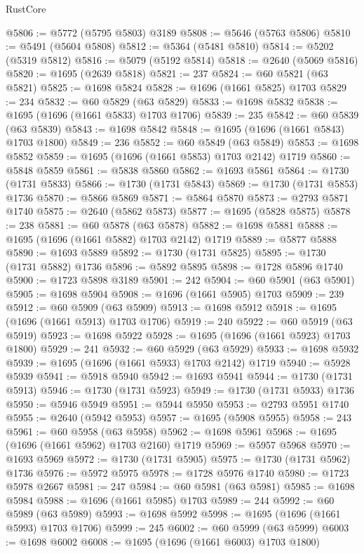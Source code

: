 \begin{lexlean}{RustCore}
\begin{coremodule}
@5806 := @5772 (@5795 @5803) @3189
@5808 := @5646 (@5763 @5806)
@5810 := @5491 (@5604 @5808)
@5812 := @5364 (@5481 @5810)
@5814 := @5202 (@5319 @5812)
@5816 := @5079 (@5192 @5814)
@5818 := @2640 (@5069 @5816)
@5820 := @1695 (@2639 @5818)
@5821 := 237
@5824 := @60 @5821 (@63 @5821)
@5825 := @1698 @5824
@5828 := @1696 (@1661 @5825) @1703
@5829 := 234
@5832 := @60 @5829 (@63 @5829)
@5833 := @1698 @5832
@5838 := @1695 (@1696 (@1661 @5833) @1703 @1706)
@5839 := 235
@5842 := @60 @5839 (@63 @5839)
@5843 := @1698 @5842
@5848 := @1695 (@1696 (@1661 @5843) @1703 @1800)
@5849 := 236
@5852 := @60 @5849 (@63 @5849)
@5853 := @1698 @5852
@5859 := @1695 (@1696 (@1661 @5853) @1703 @2142) @1719
@5860 := @5848 @5859
@5861 := @5838 @5860
@5862 := @1693 @5861
@5864 := @1730 (@1731 @5833)
@5866 := @1730 (@1731 @5843)
@5869 := @1730 (@1731 @5853) @1736
@5870 := @5866 @5869
@5871 := @5864 @5870
@5873 := @2793 @5871 @1740
@5875 := @2640 (@5862 @5873)
@5877 := @1695 (@5828 @5875)
@5878 := 238
@5881 := @60 @5878 (@63 @5878)
@5882 := @1698 @5881
@5888 := @1695 (@1696 (@1661 @5882) @1703 @2142) @1719
@5889 := @5877 @5888
@5890 := @1693 @5889
@5892 := @1730 (@1731 @5825)
@5895 := @1730 (@1731 @5882) @1736
@5896 := @5892 @5895
@5898 := @1728 @5896 @1740
@5900 := @1723 @5898 @3189
@5901 := 242
@5904 := @60 @5901 (@63 @5901)
@5905 := @1698 @5904
@5908 := @1696 (@1661 @5905) @1703
@5909 := 239
@5912 := @60 @5909 (@63 @5909)
@5913 := @1698 @5912
@5918 := @1695 (@1696 (@1661 @5913) @1703 @1706)
@5919 := 240
@5922 := @60 @5919 (@63 @5919)
@5923 := @1698 @5922
@5928 := @1695 (@1696 (@1661 @5923) @1703 @1800)
@5929 := 241
@5932 := @60 @5929 (@63 @5929)
@5933 := @1698 @5932
@5939 := @1695 (@1696 (@1661 @5933) @1703 @2142) @1719
@5940 := @5928 @5939
@5941 := @5918 @5940
@5942 := @1693 @5941
@5944 := @1730 (@1731 @5913)
@5946 := @1730 (@1731 @5923)
@5949 := @1730 (@1731 @5933) @1736
@5950 := @5946 @5949
@5951 := @5944 @5950
@5953 := @2793 @5951 @1740
@5955 := @2640 (@5942 @5953)
@5957 := @1695 (@5908 @5955)
@5958 := 243
@5961 := @60 @5958 (@63 @5958)
@5962 := @1698 @5961
@5968 := @1695 (@1696 (@1661 @5962) @1703 @2160) @1719
@5969 := @5957 @5968
@5970 := @1693 @5969
@5972 := @1730 (@1731 @5905)
@5975 := @1730 (@1731 @5962) @1736
@5976 := @5972 @5975
@5978 := @1728 @5976 @1740
@5980 := @1723 @5978 @2667
@5981 := 247
@5984 := @60 @5981 (@63 @5981)
@5985 := @1698 @5984
@5988 := @1696 (@1661 @5985) @1703
@5989 := 244
@5992 := @60 @5989 (@63 @5989)
@5993 := @1698 @5992
@5998 := @1695 (@1696 (@1661 @5993) @1703 @1706)
@5999 := 245
@6002 := @60 @5999 (@63 @5999)
@6003 := @1698 @6002
@6008 := @1695 (@1696 (@1661 @6003) @1703 @1800)

\end{coremodule}
\end{lexlean}
